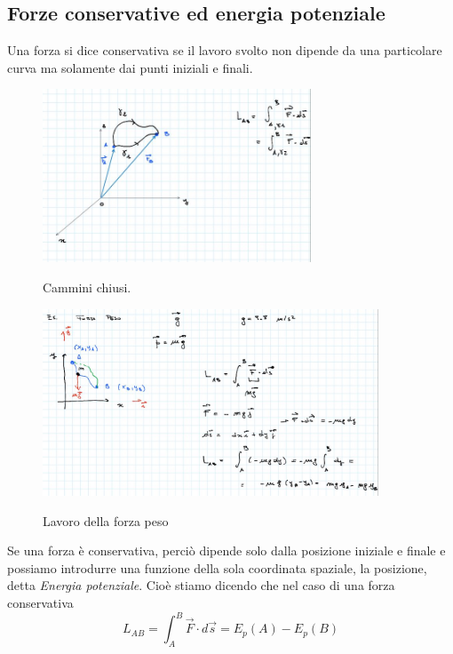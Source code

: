 \subsection{Forze conservative ed energia potenziale}

\begin{definizione}
Una forza si dice conservativa se il lavoro svolto non dipende da una particolare curva ma solamente dai punti iniziali e finali. 
\end{definizione}
	\begin{figure}[h]
	\begin{center}
		\includegraphics[width=8cm]{lezione7/images/6Precorsolavoroedenergia}\\
		\caption{Cammini chiusi.}
	\end{center}
\end{figure}

\begin{esempio}
	\begin{figure}[h]
	\begin{center}
		\includegraphics[width=10cm]{lezione7/images/7Precorsolavoroedenergia}\\
		\caption{Lavoro della forza peso}
	\end{center}
\end{figure}

\end{esempio}

Se una forza è conservativa, perciò dipende solo dalla posizione iniziale e finale e possiamo introdurre una funzione della sola coordinata spaziale, la posizione, detta \textit{Energia potenziale}. Cioè stiamo dicendo che nel caso di una forza conservativa 
$$L_{AB}=\int_{A}^{B} \vec{F}\cdot d \vec{s} = E_p (A)- E_p (B)$$

